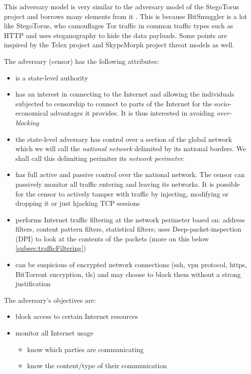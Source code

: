 \documentclass[11pt]{book} %
\newcommand{\projectName}{BitSmuggler }
\begin{document}
This adversary model is very similar to the adversary model of the StegoTorus project  \citep*{stegotorus} and borrows many elements from it . This is because \projectName  is a lot like StegoTorus, who camouflages Tor traffic in common traffic types such as HTTP and uses steganography to hide the data payloads. Some points are inspired by the Telex project \citep*{telex11} and SkypeMorph project\citep*{skypeMorph} threat models as well.

The adversary (censor) has the following attributes:

\begin{itemize}
\item is a state-level authority
\item has an interest in connecting to the Internet and allowing the individuals subjected to censorship to connect to parts of the Internet for the socio-economical advantages it provides. It is thus interested in avoiding \textit{over-blocking}
\item the state-level adversary has control over a section of the global network which we will call the \textit{national network} delimited by its national borders. We shall call this delimiting perimiter its \textit{network perimeter}.
\item has full active and passive control over the national network. The censor can passively monitor all traffic entering and leaving its networks. It is possible for the censor to actively tamper with traffic by injecting, modifying or dropping it or just hjacking TCP sessions
\item performs Internet traffic filtering at the network perimeter based on: address filters, content pattern filters, statistical filters; uses Deep-packet-inspection (DPI) to look at the contents of the packets (more on this below \ref{subsec:trafficFiltering})

\item can be suspicious of encrypted network connections (ssh, vpn protocol, https, BitTorrent encryption, tls) and may choose to block them without a strong justification

\end{itemize}

The adversary's objectives are:
\begin{itemize}
\item block access to certain Internet resources
\item monitor all Internet usage
\begin{itemize}
\item know which parties are communicating
\item know the content/type of their communication
\end{itemize}
\end{itemize}
\end{document}
